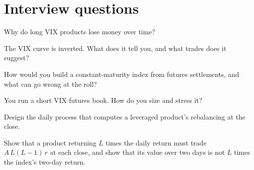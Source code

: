 \section{Interview questions}

\begin{interviewq}\label{iq:s2:the-volatility-index-complex:1}
Why do long VIX products lose money over time?
\end{interviewq}

\begin{interviewq}\label{iq:s2:the-volatility-index-complex:2}
The VIX curve is inverted. What does it tell you, and what trades does it suggest?
\end{interviewq}

\begin{interviewq}\label{iq:s2:the-volatility-index-complex:3}
How would you build a constant-maturity index from futures settlements, and what can go wrong at the roll?
\end{interviewq}

\begin{interviewq}\label{iq:s2:the-volatility-index-complex:4}
You run a short VIX futures book. How do you size and stress it?
\end{interviewq}

\begin{interviewq}\label{iq:s2:the-volatility-index-complex:5}
Design the daily process that computes a leveraged product's rebalancing at the close.
\end{interviewq}

\begin{interviewq}\label{iq:s2:the-volatility-index-complex:6}
Show that a product returning $L$ times the daily return must trade $A\,L(L - 1)\,r$ at each close, and show that its value over two days is not $L$
times the index's two-day return.
\end{interviewq}
